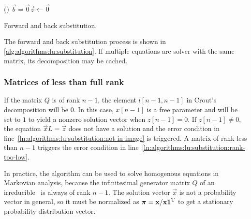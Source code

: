 \begin{algorithm}
  \;
  \lIf()
  {$\vec{b} = \vec{0}$}{$\vec{z} \gets \vec{0}$}
   
  \;
  \caption{Forward and back substitution.}
  \label{alg:algorithms:lu:substitution}
\end{algorithm}

The forward and back substitution process is shown in
\vref{alg:algorithms:lu:substitution}. If multiple equations are
solver with the same matrix, its  decomposition may be
cached.

\subsubsection{Matrices of less than full rank}

If the matrix $Q$ is of rank $n - 1$, the element $l[n - 1, n - 1]$ in
Crout's  decomposition will be $0$. In this case,
$x[n - 1]$ is a free parameter and will be set to $1$ to yield a
nonzero solution vector when $z[n - 1] = 0$. If $z[n - 1] \ne 0$, the
equation $\vec{x} L = \vec{z}$ does not have a solution and the error
condition in line~\ref{ln:algorithms:lu:substitution:not-in-image} is
triggered. A matrix of rank less than $n - 1$ triggers the error
condition in line~\ref{ln:algorithms:lu:substitution:rank-too-low}.

In practice, the algorithm can be used to solve homogenous equations
in Markovian analysis, because the infinitesimal generator matrix $Q$
of an irreducible \CTMC\ is always of rank $n - 1$. The solution
vector $\vec{x}$ is not a probability vector in general, so it must be
normalized as $\bm{\mathrm{\pi}} = \bm{\mathrm{x}} / \bm{\mathrm{x}} \bm{\mathrm{1}}^{\mathrm{T}}$ to get a
stationary probability distribution vector.

